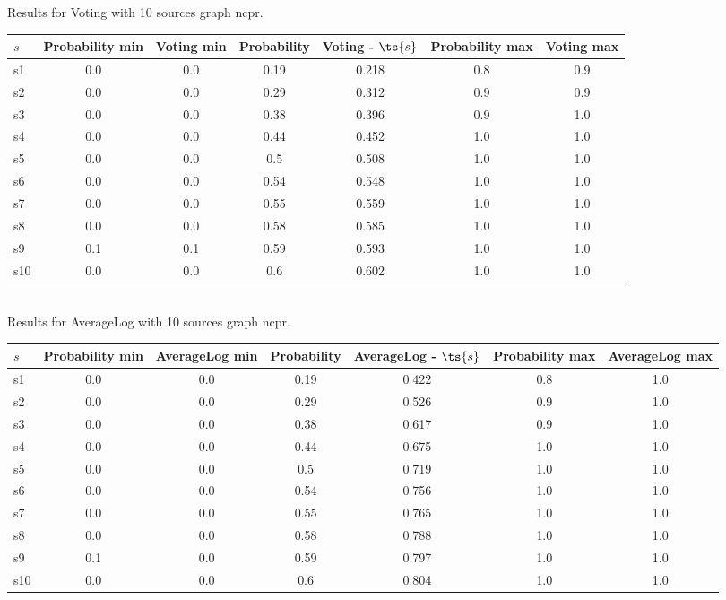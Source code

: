 \documentclass{article}
\begin{document}
\noindent Results for Voting with 10 sources graph ncpr.

\noindent\begin{tabular}{|l|c|c|c|c|c|c|}
\hline
$s$& Probability min & Voting min & Probability & Voting - $\ts{s}$ & Probability max & Voting max\\
\hline
s1 &0.0 & 0.0 & 0.19 & 0.218 & 0.8 & 0.9\\
\hline
s2 &0.0 & 0.0 & 0.29 & 0.312 & 0.9 & 0.9\\
\hline
s3 &0.0 & 0.0 & 0.38 & 0.396 & 0.9 & 1.0\\
\hline
s4 &0.0 & 0.0 & 0.44 & 0.452 & 1.0 & 1.0\\
\hline
s5 &0.0 & 0.0 & 0.5 & 0.508 & 1.0 & 1.0\\
\hline
s6 &0.0 & 0.0 & 0.54 & 0.548 & 1.0 & 1.0\\
\hline
s7 &0.0 & 0.0 & 0.55 & 0.559 & 1.0 & 1.0\\
\hline
s8 &0.0 & 0.0 & 0.58 & 0.585 & 1.0 & 1.0\\
\hline
s9 &0.1 & 0.1 & 0.59 & 0.593 & 1.0 & 1.0\\
\hline
s10 &0.0 & 0.0 & 0.6 & 0.602 & 1.0 & 1.0\\
\hline
\end{tabular}\\

\noindent Results for AverageLog with 10 sources graph ncpr.

\noindent\begin{tabular}{|l|c|c|c|c|c|c|}
\hline
$s$& Probability min & AverageLog min & Probability & AverageLog - $\ts{s}$ & Probability max & AverageLog max\\
\hline
s1 &0.0 & 0.0 & 0.19 & 0.422 & 0.8 & 1.0\\
\hline
s2 &0.0 & 0.0 & 0.29 & 0.526 & 0.9 & 1.0\\
\hline
s3 &0.0 & 0.0 & 0.38 & 0.617 & 0.9 & 1.0\\
\hline
s4 &0.0 & 0.0 & 0.44 & 0.675 & 1.0 & 1.0\\
\hline
s5 &0.0 & 0.0 & 0.5 & 0.719 & 1.0 & 1.0\\
\hline
s6 &0.0 & 0.0 & 0.54 & 0.756 & 1.0 & 1.0\\
\hline
s7 &0.0 & 0.0 & 0.55 & 0.765 & 1.0 & 1.0\\
\hline
s8 &0.0 & 0.0 & 0.58 & 0.788 & 1.0 & 1.0\\
\hline
s9 &0.1 & 0.0 & 0.59 & 0.797 & 1.0 & 1.0\\
\hline
s10 &0.0 & 0.0 & 0.6 & 0.804 & 1.0 & 1.0\\
\hline
\end{tabular}\\
\end{document}
